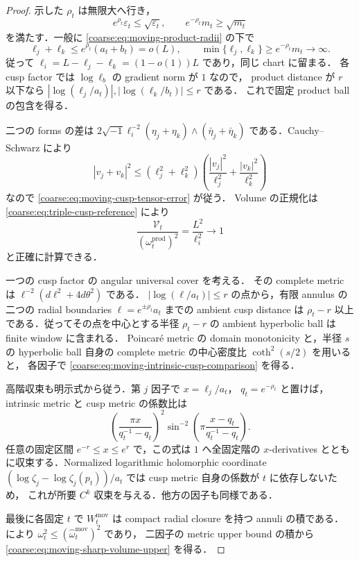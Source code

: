 \begin{proof}
示した $\rho_t$ は無限大へ行き，
\[
 e^{\rho_t}\varepsilon_t\le\sqrt{\varepsilon_t},
 \qquad
 e^{-\rho_t}m_t\ge\sqrt{m_t}
\]
を満たす．一般に \eqref{coarse:eq:moving-product-radii} の下で
\[
 \ell_j+\ell_k\le e^{\rho_t}(a_t+b_t)=o(L),
 \qquad
 \min\{\ell_j,\ell_k\}\ge e^{-\rho_t}m_t\to\infty.
\]
従って $\ell_i=L-\ell_j-\ell_k=(1-o(1))L$ であり，同じ chart に留まる．
各 cusp factor では $\log\ell_b$ の gradient norm が $1$ なので，
product distance が $r$ 以下なら
$|\log(\ell_j/a_t)|,|\log(\ell_k/b_t)|\le r$ である．
これで固定 product ball の包含を得る．

二つの forms の差は
$2\sqrt{-1}\ell_i^{-2}(\eta_j+\eta_k)\wedge
 (\bar\eta_j+\bar\eta_k)$ である．Cauchy--Schwarz により
\[
 |v_j+v_k|^2
 \le(\ell_j^2+\ell_k^2)
       \left(\frac{|v_j|^2}{\ell_j^2}
             +\frac{|v_k|^2}{\ell_k^2}\right)
\]
なので \eqref{coarse:eq:moving-cusp-tensor-error} が従う．
Volume の正規化は \eqref{coarse:eq:triple-cusp-reference} により
\[
 \frac{\mathcal V_t}{(\omega_t^{\mathrm{prod}})^2}
  =\frac{L^2}{\ell_i^2}\longrightarrow1
\]
と正確に計算できる．

一つの cusp factor の angular universal cover を考える．
その complete metric は $\ell^{-2}(d\ell^2+4d\theta^2)$ である．
$|\log(\ell/a_t)|\le r$ の点から，有限 annulus の二つの radial boundaries
$\ell=e^{\pm\rho_t}a_t$ までの ambient cusp distance は
$\rho_t-r$ 以上である．従ってその点を中心とする半径 $\rho_t-r$ の
ambient hyperbolic ball は finite window に含まれる．
Poincar\'e metric の domain monotonicity と，半径 $s$ の hyperbolic ball
自身の complete metric の中心密度比 $\coth^2(s/2)$ を用いると，
各因子で \eqref{coarse:eq:moving-intrinsic-cusp-comparison} を得る．

高階収束も明示式から従う．第 $j$ 因子で $x=\ell_j/a_t$，
$q_t=e^{-\rho_t}$ と置けば，intrinsic metric と cusp metric の係数比は
\[
 \left(\frac{\pi x}{q_t^{-1}-q_t}\right)^2
 \sin^{-2}\!\left(\pi\frac{x-q_t}{q_t^{-1}-q_t}\right).
\]
任意の固定区間 $e^{-r}\le x\le e^r$ で，この式は $1$ へ全固定階の
$x$-derivatives とともに収束する．Normalized logarithmic holomorphic coordinate
$(\log\zeta_j-\log\zeta_j(p_t))/a_t$ では cusp metric 自身の係数が $t$ に依存しないため，
これが所要 $C^k$ 収束を与える．他方の因子も同様である．

最後に各固定 $t$ で $W_t^{\mathrm{mov}}$ は compact radial closure を持つ annuli の積である．
 により
$\omega_t^2\le(\widehat\omega_t^{\mathrm{mov}})^2$ であり，
二因子の metric upper bound の積から
\eqref{coarse:eq:moving-sharp-volume-upper} を得る．
\end{proof}

